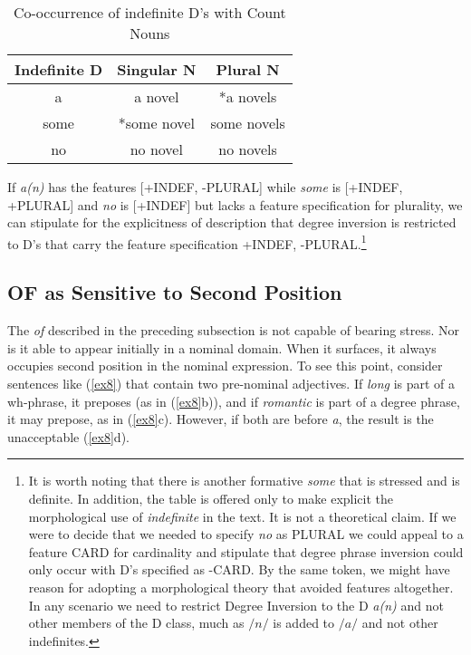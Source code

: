 \documentclass[output=paper,
modfonts
]{LSP/langsci}
\begin{document}
{{\begin{exe}
\ex \label{ex7}
\begin{xlist}
\end{xlist}

\end{exe}

\begin{table}[ht]

\centering
\begin{tabular}{| c | c | c |}
\hline
Indefinite D & Singular N  &  Plural N \\
\hline
a & {a novel} & {*a novels}  \\
some & {*some novel}  & {some novels} \\
no & {no novel} & {no novels} \\ 
\hline

\end{tabular}
\caption{Co-occurrence of indefinite D's with Count Nouns}
\end{table}

If {\textit{a(n)}}  has the features [+INDEF, -PLURAL]  while {\textit{some}} is [+INDEF, +PLURAL] and {\textit{no}} is [+INDEF] but lacks a feature specification for plurality, we can stipulate for the explicitness of description that degree inversion is restricted to D's that carry the feature specification +INDEF, -PLURAL.\footnote{It is worth noting that there is another formative {\textit{some}} that is stressed and is definite.  In addition, the table is offered only to make explicit the morphological use of {\textit{indefinite}} in the text.  It is not a theoretical claim.  If we were to decide that we needed to specify {\textit{no}} as PLURAL we could appeal to a feature CARD for cardinality and stipulate that degree phrase inversion could only occur with D's specified as -CARD.  By the same token, we might have reason for adopting a morphological theory that avoided features altogether.  In any scenario we need to restrict Degree Inversion to the D {\textit{a(n)}} and not other members of the D class, much as {\textit{$/n/$}} is added to {\textit{$/a/$}} and not other indefinites.}

\subsection{OF as Sensitive to Second Position}
The {\textit{of}} described in the preceding subsection is not capable of bearing stress.  Nor is it able to appear initially in a nominal domain.  When it surfaces, it always occupies second position in the nominal expression.  To see this point, consider sentences like ({\ref{ex8}}) that contain two pre-nominal adjectives.  If {\textit{long}} is part of a wh-phrase, it preposes (as in ({\ref{ex8}}b)), and if {\textit{romantic}} is part of a degree phrase, it may prepose, as in ({\ref{ex8}}c).  However, if both are before {\textit{a}}, the result is the unacceptable ({\ref{ex8}}d).

}}
\end{document}
